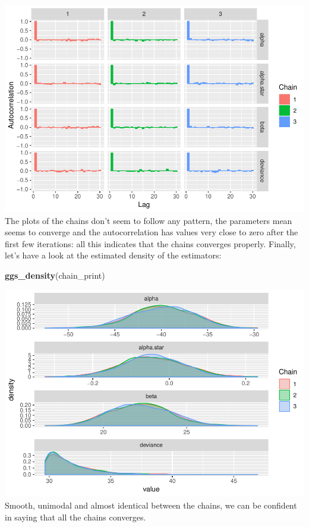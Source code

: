 \documentclass[]{article}
\newenvironment{Shaded}{\begin{snugshade}}{\end{snugshade}}
\newcommand{\KeywordTok}[1]{\textcolor[rgb]{0.13,0.29,0.53}{\textbf{#1}}}
\newcommand{\NormalTok}[1]{#1}
\begin{document}
\includegraphics{FinalProject-SDSII_files/figure-latex/unnamed-chunk-25-3.pdf}
The plots of the chains don't seem to follow any pattern, the parameters
mean seems to converge and the autocorrelation has values very close to
zero after the first few iterations: all this indicates that the chains
converges properly. Finally, let's have a look at the estimated density
of the estimators:

\begin{Shaded}
\begin{Highlighting}[]
\KeywordTok{ggs_density}\NormalTok{(chain_print)}
\end{Highlighting}
\end{Shaded}

\includegraphics{FinalProject-SDSII_files/figure-latex/unnamed-chunk-26-1.pdf}
Smooth, unimodal and almost identical between the chains, we can be
confident in saying that all the chains converges.
\end{document}
